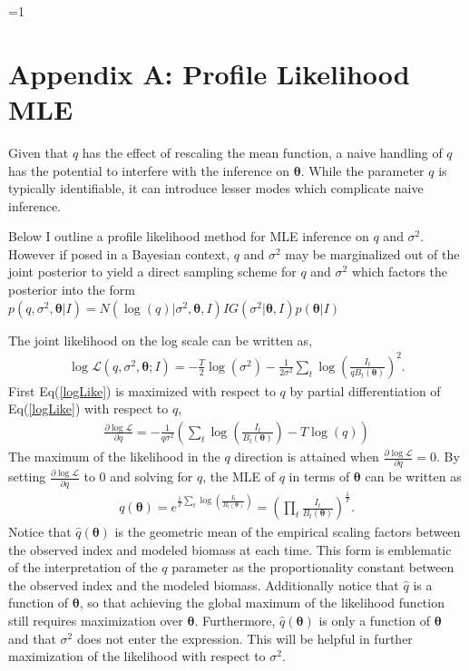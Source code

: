 \documentclass[12pt]{article}
\newcounter{alphasect}
\def\alphainsection{0}
\let\oldsection=\section
\def\section{%
  \ifnum\alphainsection=1%
    \addtocounter{alphasect}{1}
  \fi%
\oldsection}%
\begin{document}
\clearpage
\section*{Appendix A: Profile Likelihood MLE \label{appMLE}}
Given that $q$ has the effect of rescaling the mean function, a 
naive handling of $q$ has the potential to interfere with the inference on 
$\bm{\theta}$. While the parameter $q$ is typically identifiable, it can 
introduce lesser modes which complicate naive inference.

%
Below I outline a profile likelihood method for MLE inference on $q$ and 
$\sigma^2$. However if posed in a %
Bayesian context, $q$ and 
$\sigma^2$ may be marginalized out of the joint posterior to yield a direct 
sampling scheme for $q$ and $\sigma^2$ which factors the posterior into the 
form $p(q, \sigma^2, \bm{\theta}|I) = N(\log(q)| \sigma^2, \bm{\theta}, I) IG(\sigma^2|\bm{\theta}, I) p(\bm{\theta}|I)$ 

%
The joint likelihood on the log scale can be written as, 
\begin{align}
\log\mathcal{L}(q, \sigma^2, \bm{\theta}; I) = - \frac{T}{2}\log(\sigma^2) - \frac{1}{2\sigma^2}\sum_t \log\left(\frac{I_t}{qB_t(\bm{\theta})}\right)^2. \label{logLike} 
\end{align}
%
First Eq(\ref{logLike}) is maximized with respect to $q$ by partial 
differentiation of Eq(\ref{logLike}) with respect to $q$, 
%
\begin{align}
\frac{\partial \log\mathcal{L}}{\partial q} = -\frac{1}{q\sigma^2}\left(\sum_t \log\left(\frac{I_t}{B_t(\bm{\theta})}\right) - T\log(q)\right)
\end{align}
%
The maximum of the likelihood in the $q$ direction is attained when 
$\frac{\partial \log\mathcal{L}}{\partial q}=0$. By setting 
$\frac{\partial \log\mathcal{L}}{\partial q}$ to 0 and solving for 
$q$, the MLE of $q$ in terms of $\bm{\theta}$ can be written as
%
\begin{align}
q(\bm{\theta}) = e^{ \frac{1}{T}\sum_t \log\left(\frac{I_t}{B_t(\bm{\theta})}\right) } = \left(\prod_t\frac{I_t}{B_t(\bm{\theta})}\right)^{\frac{1}{T}}. \label{qHat}
\end{align}
%
Notice that $\hat q(\bm{\theta})$ is the geometric mean of the empirical 
scaling factors between the observed index and modeled biomass at each time. 
This form is emblematic of the interpretation of the $q$ parameter as the 
proportionality constant between the observed index and the modeled biomass. 
Additionally notice that $\hat q$ is a function of $\bm\theta$, so that 
achieving the global maximum of the likelihood function still requires 
maximization over $\bm\theta$. Furthermore, $\hat q(\bm{\theta})$ is only a 
function of $\bm{\theta}$ and that $\sigma^2$ does not enter the expression.  
This will be helpful in further maximization of the likelihood with respect to 
$\sigma^2$.  
\end{document}
